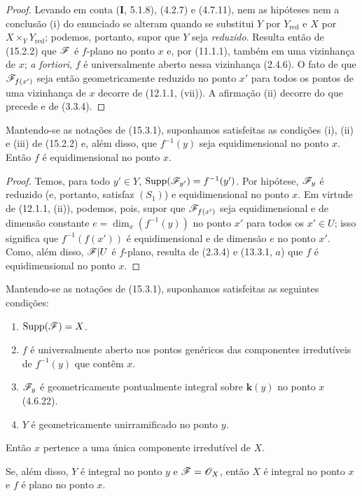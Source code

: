\begin{proof}
\label{IV.15.3.1-proof}
Levando em conta (\textbf{I}, 5.1.8), (4.2.7) e (4.7.11), nem as hipóteses nem a conclusão (i) do enunciado se alteram quando se substitui $Y$ por $Y_{\mathrm{red}}$ e $X$ por $X\times_Y Y_{\mathrm{red}}$; podemos, portanto, supor que $Y$ seja \emph{reduzido}. Resulta então de (15.2.2) que $\mathscr{F}$ é $f$-plano no ponto $x$ e, por (11.1.1), também em uma vizinhança de $x$; \emph{a fortiori}, $f$ é universalmente aberto nessa vizinhança (2.4.6). O fato de que $\mathscr{F}_{f(x')}$ seja então geometricamente reduzido no ponto $x'$
para todos os pontos de uma vizinhança de $x$ decorre de (12.1.1, (vii)). A afirmação (ii) decorre do que precede e de (3.3.4).
\end{proof}

\begin{proposition}[15.3.2]
\label{IV.15.3.2}
Mantendo-se as notações de (15.3.1), suponhamos satisfeitas as condições (i), (ii) e (iii) de (15.2.2) e, além disso, que $f^{-1}(y)$ seja equidimensional no ponto $x$. Então $f$ é equidimensional no ponto $x$.
\end{proposition}

\begin{proof}
\label{IV.15.3.2-proof}
Temos, para todo $y'\in Y$, $\operatorname{Supp}(\mathscr{F}_{y'})=f^{-1}(y')$. Por hipótese, $\mathscr{F}_y$ é reduzido (e, portanto, satisfaz $(S_1)$) e equidimensional no ponto $x$. Em virtude de (12.1.1, (ii)), podemos, pois, supor que $\mathscr{F}_{f(x')}$ seja equidimensional e de dimensão constante $e=\dim_x(f^{-1}(y))$ no ponto $x'$ para todos os $x'\in U$; isso significa que $f^{-1}(f(x'))$ é equidimensional e de dimensão $e$ no ponto $x'$. Como, além disso, $\mathscr{F}|U$ é $f$-plano, resulta de (2.3.4) e (13.3.1, $a$) que $f$ é equidimensional no ponto $x$.
\end{proof}

\begin{corollary}[15.3.3]
\label{IV.15.3.3}
Mantendo-se as notações de (15.3.1), suponhamos satisfeitas as seguintes condições:
\begin{enumerate}[label=(\roman*)]
  \item $\operatorname{Supp}(\mathscr{F})=X$.
  \item $f$ é universalmente aberto nos pontos genéricos das componentes irredutíveis de $f^{-1}(y)$ que contêm $x$.
  \item $\mathscr{F}_y$ é geometricamente pontualmente integral sobre $\mathbf{k}(y)$ no ponto $x$ (4.6.22).
  \item $Y$ é geometricamente unirramificado no ponto $y$.
\end{enumerate}
Então $x$ pertence a uma única componente irredutível de $X$.

Se, além disso, $Y$ é integral no ponto $y$ e $\mathscr{F}=\mathscr{O}_X$, então $X$ é integral no ponto $x$ e $f$ é plano no ponto $x$.
\end{corollary}

